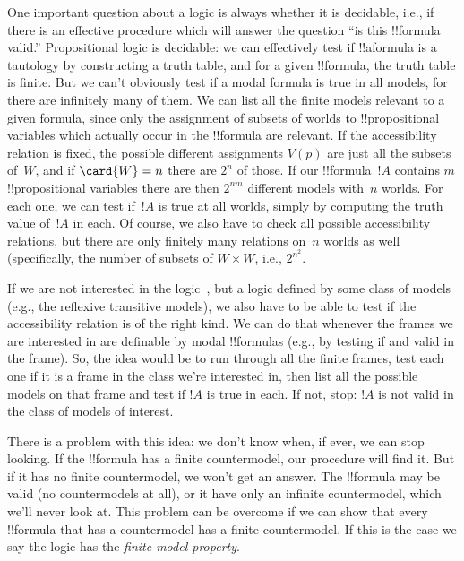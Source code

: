 \documentclass[../../../include/open-logic-section]{subfiles}
\begin{document}

One important question about a logic is always whether it is
decidable, i.e., if there is an effective procedure which will answer
the question ``is this !!{formula} valid.'' Propositional logic is
decidable: we can effectively test if !!a{formula} is a tautology by
constructing a truth table, and for a given !!{formula}, the truth
table is finite.  But we can't obviously test if a modal formula is
true in all models, for there are infinitely many of them.  We can
list all the finite models relevant to a given formula, since only the
assignment of subsets of worlds to !!{propositional variable}s which
actually occur in the !!{formula} are relevant. If the accessibility
relation is fixed, the possible different assignments $V(p)$ are just
all the subsets of~$W$, and if $\card{W} = n$ there are $2^n$ of
those. If our !!{formula}~$!A$ contains $m$ !!{propositional
  variable}s there are then $2^{nm}$ different models with~$n$
worlds. For each one, we can test if~$!A$ is true at all worlds,
simply by computing the truth value of~$!A$ in each. Of course, we
also have to check all possible accessibility relations, but there are
only finitely many relations on~$n$ worlds as well (specifically, the
number of subsets of $W \times W$, i.e., $2^{n^2}$.

If we are not interested in the logic~, but a logic defined by
some class of models (e.g., the reflexive transitive models), we also
have to be able to test if the accessibility relation is of the right
kind. We can do that whenever the frames we are interested in are
definable by modal !!{formula}s (e.g., by testing if  and 
valid in the frame). So, the idea would be to run through all the
finite frames, test each one if it is a frame in the class we're
interested in, then list all the possible models on that frame and
test if $!A$ is true in each. If not, stop: $!A$ is not valid in the
class of models of interest.

There is a problem with this idea: we don't know when, if ever, we can
stop looking. If the !!{formula} has a finite countermodel, our procedure will
find it. But if it has no finite countermodel, we won't get an
answer. The !!{formula} may be valid (no countermodels at all), or it
have only an infinite countermodel, which we'll never look at. This
problem can be overcome if we can show that every !!{formula} that has
a countermodel has a finite countermodel. If this is the case we say
the logic has the \emph{finite model property}.
\end{document}
